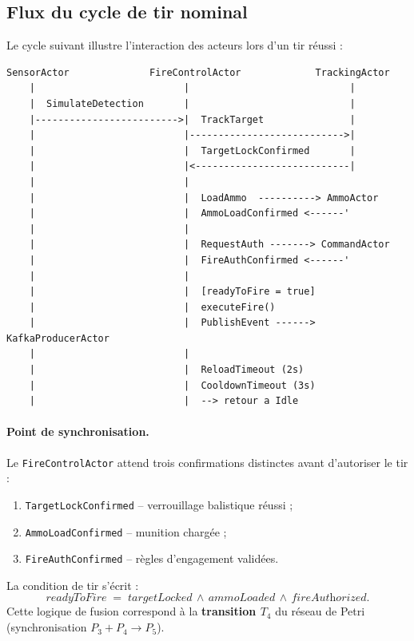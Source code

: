 \documentclass[11pt,a4paper]{article}
\newcommand{\code}[1]{\texttt{#1}}
\begin{document}
\subsection{Flux du cycle de tir nominal}

Le cycle suivant illustre l'interaction des acteurs lors d'un tir réussi :

\begin{lstlisting}[caption={Diagramme de séquence simplifié du cycle nominal.}]
SensorActor              FireControlActor             TrackingActor
    |                          |                            |
    |  SimulateDetection       |                            |
    |------------------------->|  TrackTarget               |
    |                          |--------------------------->|
    |                          |  TargetLockConfirmed       |
    |                          |<---------------------------|
    |                          |
    |                          |  LoadAmmo  ----------> AmmoActor
    |                          |  AmmoLoadConfirmed <------'
    |                          |
    |                          |  RequestAuth -------> CommandActor
    |                          |  FireAuthConfirmed <------'
    |                          |
    |                          |  [readyToFire = true]
    |                          |  executeFire()
    |                          |  PublishEvent ------> KafkaProducerActor
    |                          |
    |                          |  ReloadTimeout (2s)
    |                          |  CooldownTimeout (3s)
    |                          |  --> retour a Idle
\end{lstlisting}

\paragraph{Point de synchronisation.}
Le \code{FireControlActor} attend trois confirmations distinctes avant
d'autoriser le tir :
\begin{enumerate}[leftmargin=1.2cm,itemsep=1pt]
  \item \code{TargetLockConfirmed} -- verrouillage balistique réussi ;
  \item \code{AmmoLoadConfirmed}   -- munition chargée ;
  \item \code{FireAuthConfirmed}   -- règles d'engagement validées.
\end{enumerate}
La condition de tir s'écrit :
\[
\textit{readyToFire} \;=\; \textit{targetLocked} \,\wedge\, \textit{ammoLoaded}
\,\wedge\, \textit{fireAuthorized}.
\]
Cette logique de fusion correspond à la \textbf{transition $T_4$} du réseau de
Petri (synchronisation $P_3 + P_4 \rightarrow P_5$).
\end{document}
